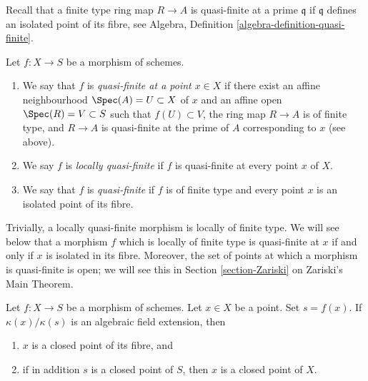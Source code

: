 \medskip\noindent
Recall that a finite type ring map $R \to A$ is quasi-finite at
a prime $\mathfrak q$ if $\mathfrak q$ defines an isolated point
of its fibre, see Algebra, Definition \ref{algebra-definition-quasi-finite}.

\begin{definition}
\label{definition-quasi-finite}
\begin{reference}
\cite[II Definition 6.2.3]{EGA}
\end{reference}
Let $f : X \to S$ be a morphism of schemes.
\begin{enumerate}
\item We say that $f$ is {\it quasi-finite at a point $x \in X$}
if there exist an affine neighbourhood $\Spec(A) = U \subset X$
of $x$ and an affine open $\Spec(R) = V \subset S$ such that
$f(U) \subset V$, the ring map $R \to A$ is of finite type,
and $R \to A$ is quasi-finite at the prime of $A$ corresponding to $x$
(see above).
\item We say $f$ is {\it locally quasi-finite} if $f$ is
quasi-finite at every point $x$ of $X$.
\item We say that $f$ is {\it quasi-finite} if $f$ is of finite type
and every point $x$ is an isolated point of its fibre.
\end{enumerate}
\end{definition}

\noindent
Trivially, a locally quasi-finite morphism is locally of finite type.
We will see below that a morphism $f$ which is locally of finite type
is quasi-finite at $x$ if and only if $x$ is isolated in its fibre.
Moreover, the set of points at which a morphism is quasi-finite is open;
we will see this in Section \ref{section-Zariski} on Zariski's Main Theorem.

\begin{lemma}
\label{lemma-algebraic-residue-field-extension-closed-point-fibre}
Let $f : X \to S$ be a morphism of schemes.
Let $x \in X$ be a point. Set $s = f(x)$.
If $\kappa(x)/\kappa(s)$
is an algebraic field extension, then
\begin{enumerate}
\item $x$ is a closed point of its fibre, and
\item if in addition $s$ is a closed point of $S$, then
$x$ is a closed point of $X$.
\end{enumerate}
\end{lemma}

